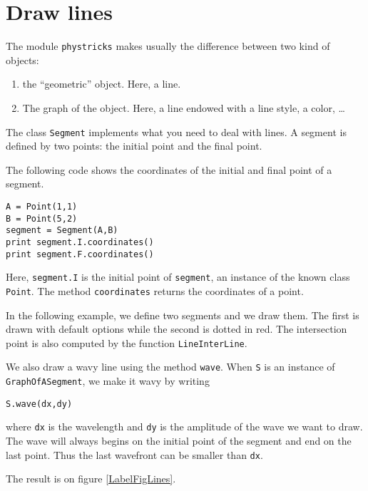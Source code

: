 \section{Draw lines}

The module \verb+phystricks+ makes usually the difference between two kind of objects:
\begin{enumerate}

	\item
		the ``geometric'' object. Here, a line.
	\item
		The graph of the object. Here, a line endowed with a line style, a color, \ldots

\end{enumerate}
The class \verb+Segment+ implements what you need to deal with lines. A segment is defined by two points: the initial point and the final point.

The following code shows the coordinates of the initial and final point of a segment.
\begin{verbatim}
A = Point(1,1)
B = Point(5,2)
segment = Segment(A,B)
print segment.I.coordinates()
print segment.F.coordinates()
\end{verbatim}
Here, \verb+segment.I+ is the initial point of \verb+segment+, an instance of the known class \verb+Point+. The method \verb+coordinates+ returns the coordinates of a point.

In the following example, we define two segments and we draw them. The first is drawn with default options while the second is dotted in red. The intersection point is also computed by the function \verb+LineInterLine+.

We also draw a wavy line using the method \verb+wave+. When \verb+S+ is an instance of \verb+GraphOfASegment+, we make it wavy by writing
\begin{verbatim}
S.wave(dx,dy)
\end{verbatim}
where \verb+dx+ is the wavelength and \verb+dy+ is the amplitude of the wave we want to draw. The wave will always begins on the initial point of the segment and end on the last point. Thus the last wavefront can be smaller than \verb+dx+.

The result is on figure \ref{LabelFigLines}.
\newcommand{\CaptionFigLines}{Example of lines and an intersection.}



